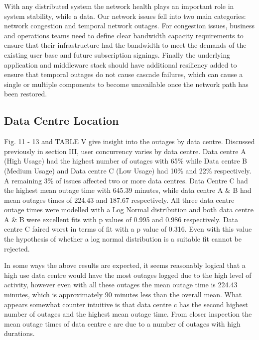 \documentclass[conference]{IEEEtran}
\begin{document}
With any distributed system the network health plays an important role in system stability, while a data. Our network issues fell into two main categories: network congestion and temporal network outages. For congestion issues, business and operations teams need to define clear bandwidth capacity requirements to ensure that their infrastructure had the bandwidth to meet the demands of the existing user base and future subscription signings. Finally the underlying application and middleware stack should have additional resiliency added to ensure that temporal outages do not cause cascade failures, which can cause a single or multiple components to become unavailable once the network path has been restored. \par


\subsection{Data Centre Location}

Fig. 11 - 13 and TABLE V give insight into the outages by data centre. Discussed previously in section III, user concurrency varies by data centre. Data centre A (High Usage) had the highest number of outages with 65\% while Data centre B (Medium Usage) and Data centre C (Low Usage) had 10\% and 22\% respectively. A remaining 3\% of issues affected two or more data centres. Data Centre C had the highest mean outage time with 645.39 minutes, while data centre A \& B had mean outages times of 224.43 and 187.67 respectively. All three data centre outage times were modelled with a Log Normal distribution and both data centre A \& B were excellent fits with p values of 0.995 and 0.986 respectively. Data centre C faired worst in terms of fit with a p value of 0.316. Even with this value the hypothesis of whether a log normal distribution is a suitable fit cannot be rejected. \par

In some ways the above results are expected, it seems reasonably logical that a high use data centre would have the most outages logged due to the high level of activity, however even with all these outages the mean outage time is 224.43 minutes, which is approximately 90 minutes less than the overall mean. What appears somewhat counter intuitive is that data centre c has the second highest number of outages and the highest mean outage time. From closer inspection the mean outage times of data centre c are due to a number of outages with high durations. \par
\end{document}
